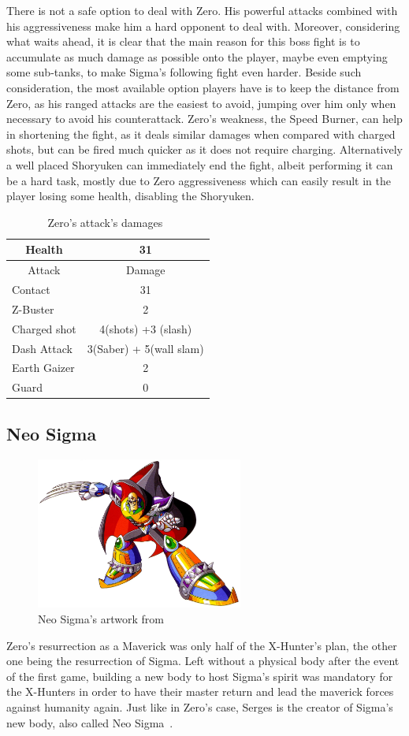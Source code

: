 There is not a safe option to deal with Zero. His powerful attacks combined with his aggressiveness make him a hard opponent to deal with. Moreover, considering what waits ahead, it is clear that the main reason for this boss fight is to accumulate as much damage as possible onto the player, maybe even emptying some sub-tanks, to make Sigma's following fight even harder. Beside such consideration, the most available option players have is to keep the distance from Zero, as his ranged attacks are the easiest to avoid, jumping over him only when necessary to avoid his counterattack. Zero's weakness, the Speed Burner, can help in shortening the fight, as it deals similar damages when compared with charged shots, but can be fired much quicker as it does not require charging. Alternatively a well placed Shoryuken can immediately end the fight, albeit performing it can be a hard task, mostly due to Zero aggressiveness which can easily result in the player losing some health, disabling the Shoryuken.
\begin{table}[htp]
	\centering
	\begin{tabular}[h]{l c}
		\toprule
		\multicolumn{1}{c}{Health}  & 31 \\
		\midrule
		\multicolumn{1}{c}{Attack} & \multicolumn{1}{c}{Damage}\\
		Contact & 31\\
		Z-Buster & 2\\
		Charged shot&4(shots) +3 (slash) \\
		Dash Attack & 3(Saber) + 5(wall slam)\\
		Earth Gaizer & 2\\
		Guard & 0\\
		\bottomrule
	\end{tabular}
	\caption{Zero's attack's damages~\cite{wiki:Zero_X2}}
\end{table}
\subsection{Neo Sigma}\label{boss:Sigma_x2}
\begin{figure}[htp]
	\centering
	\includegraphics[height=5cm]{figures/X2/Hunter_stages/Neo_Sigma.png}
	\caption{Neo Sigma's artwork from~\cite{book:MMX_Complete_art}}
\end{figure}
Zero's resurrection as a Maverick was only half of the X-Hunter's plan, the other one being the resurrection of Sigma. Left without a physical body after the event of the first game, building a new body to host Sigma's spirit was mandatory for the X-Hunters in order to have their master return and lead the maverick forces against humanity again. Just like in Zero's case, Serges is the creator of Sigma's new body, also called Neo Sigma~\cite{wayback:X2_resources}. 

